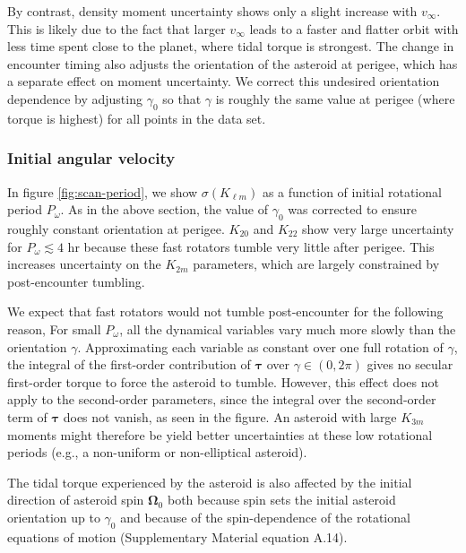 \documentclass[fleqn,usenatbib]{mnras}
\begin{document}
By contrast, density moment uncertainty shows only a slight increase with $v_\infty$. This is likely due to the fact that larger $v_\infty$ leads to a faster and flatter orbit with less time spent close to the planet, where tidal torque is strongest. The change in encounter timing also adjusts the orientation of the asteroid at perigee, which has a separate effect on moment uncertainty. We correct this undesired orientation dependence by adjusting $\gamma_0$ so that $\gamma$ is roughly the same value at perigee (where torque is highest) for all points in the data set.

\subsubsection{Initial angular velocity}
\label{sec:scan-period}

In figure \ref{fig:scan-period}, we show $\sigma(K_{\ell m})$ as a function of initial rotational period $P_\omega$. As in the above section, the value of $\gamma_0$ was corrected to ensure roughly constant orientation at perigee. $K_{20}$ and $K_{22}$ show very large uncertainty for $P_\omega \lesssim 4$ hr because these fast rotators tumble very little after perigee. This increases uncertainty on the $K_{2m}$ parameters, which are largely constrained by post-encounter tumbling.

We expect that fast rotators would not tumble post-encounter for the following reason, For small $P_\omega$, all the dynamical variables vary much more slowly than the orientation $\gamma$. Approximating each variable as constant over one full rotation of $\gamma$, the integral of the first-order contribution of $\bm \tau$ over $\gamma \in (0, 2\pi)$ gives no secular first-order torque to force the asteroid to tumble. However, this effect does not apply to the second-order parameters, since the integral over the second-order term of $\bm \tau$ does not vanish, as seen in the figure. An asteroid with large $K_{3m}$ moments might therefore be yield better uncertainties at these low rotational periods (e.g., a non-uniform or non-elliptical asteroid).

The tidal torque experienced by the asteroid is also affected by the initial direction of asteroid spin $\bm \Omega_0$ both because spin sets the initial asteroid orientation up to $\gamma_0$ and because of the spin-dependence of the rotational equations of motion (Supplementary Material equation A.14).
\end{document}
